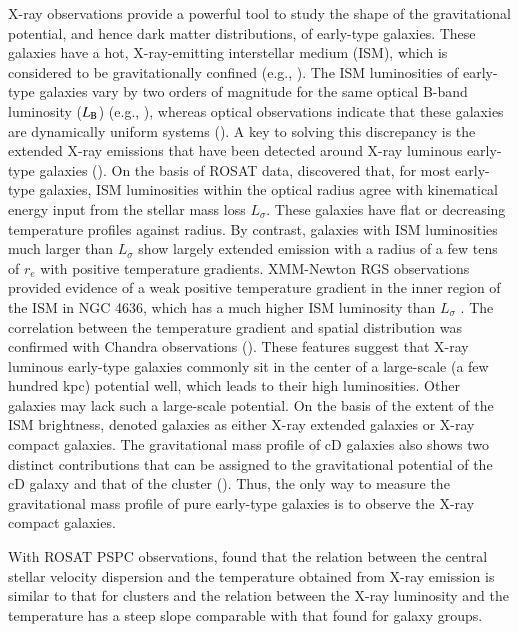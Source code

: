 \documentclass[structabstract]{aa}
\begin{document}
X-ray observations provide a powerful tool to study the shape of the
gravitational potential, and hence dark matter distributions, of
early-type galaxies. These galaxies have a hot, X-ray-emitting
interstellar medium (ISM), which is considered to be gravitationally
confined (e.g., \citealt{Form1985,Matsu2001,Fuka2006}). The ISM
luminosities of early-type galaxies vary by two
orders of magnitude for the same optical B-band luminosity
($L_{\rm{B}}$) (e.g., \citealt{Cani1987,Beui1999,Matsu2000,Matsu2001}),
whereas optical observations indicate that these
galaxies are dynamically uniform systems
(\citealt{Djor1987,Bend1993,Kron2000}). A key to solving this
discrepancy is the extended X-ray emissions that have been detected
around X-ray luminous early-type galaxies (\citealt{Matsu1998,Matsu2001}).
 On the basis of ROSAT data, \citet{Matsu2001}
discovered that, for most early-type galaxies, ISM luminosities within
the optical radius agree with kinematical energy input from the
stellar mass loss $L_{\sigma}$. These galaxies have flat or
decreasing temperature profiles against radius. By contrast, galaxies
with ISM luminosities much larger than $L_{\sigma}$ show largely extended
emission with a radius of a few tens of $r_e$ with positive temperature
gradients. 
XMM-Newton RGS observations provided evidence of a
weak positive temperature gradient in the inner region of the ISM
in NGC 4636, which has a much
higher ISM luminosity than $L_{\sigma}$ \citep{Xu2002}.
The correlation between the temperature gradient and
spatial distribution was confirmed with Chandra observations
(\citealt{Fuka2006}). These features suggest that X-ray luminous early-type
galaxies commonly sit in the center of a large-scale (a few hundred
kpc) potential well, which leads to their high luminosities. Other
galaxies may lack such a large-scale potential. On the basis of the
extent of the ISM brightness, \citet{Matsu2001} denoted galaxies as
either X-ray extended galaxies or X-ray compact galaxies. The
gravitational mass profile of cD galaxies also shows two distinct
contributions that can be assigned to the gravitational potential of
the cD galaxy and that of the cluster (\citealt{Matsu2002}). Thus,
the only way to measure the gravitational mass profile of pure
early-type galaxies is to observe the X-ray compact galaxies. 

With ROSAT PSPC observations, \citet{O'Sul2003} found that
 the relation between the  central stellar velocity dispersion 
and the temperature obtained from X-ray emission 
is similar to that for clusters and 
the relation between the X-ray luminosity and the temperature has a
steep slope comparable with that found for galaxy groups.
\end{document}
